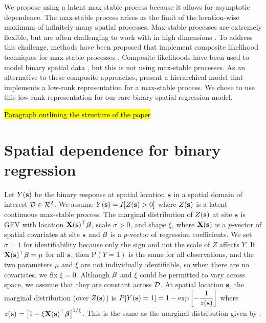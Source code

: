 \documentclass[11pt]{article}
\begin{document}
We propose using a latent max-stable process \citep{deHaan1984} because it allows for asymptotic dependence.
The max-stable process arises as the limit of the location-wise maximum of infinitely many spatial processes.
Max-stable processes are extremely flexible, but are often challenging to work with in high dimensions \citep{Wadsworth2014,Thibaud2013a}.
To address this challenge, methods have been proposed that implement composite likelihood techniques for max-stable processes \citep{Padoan2010,Genton2011,Huser2014}.
Composite likelihoods have been used to model binary spatial data \citep{Heagerty1998}, but this is not using max-stable processes.
As an alternative to these composite approaches, \citet{Reich2012} present a hierarchical model that implements a low-rank representation for a max-stable process.
We chose to use this low-rank representation for our rare binary spatial regression model.

\hl{Paragraph outlining the structure of the paper}

\section{Spatial dependence for binary regression} \label{rbs:maxstab}
Let $Y(\mbox{\bf s})$ be the binary response at spatial location $\mbox{\bf s}$ in a spatial domain of interest ${\cal D} \in {\cal R}^2$.
We assume $Y(\mbox{\bf s}) = I[Z(\mbox{\bf s}) > 0]$ where $Z(\mbox{\bf s})$ is a latent continuous max-stable process.
The marginal distribution of $Z(\mbox{\bf s})$ at site $\mbox{\bf s}$ is GEV with location $\mbox{\bf X}(\mbox{\bf s})^\top \mbox{\boldmath $\beta$}$, scale $\sigma > 0$, and shape $\xi$, where $\mbox{\bf X}(\mbox{\bf s})$ is a $p$-vector of spatial covariates at site $\mbox{\bf s}$ and $\mbox{\boldmath $\beta$}$ is a $p$-vector of regression coefficients.
We set $\sigma = 1$ for identifiability because only the sign and not the scale of $Z$ affects $Y$.
If $\mbox{\bf X}(\mbox{\bf s})^\top \mbox{\boldmath $\beta$} = \mu$ for all $\mbox{\bf s}$, then P$(Y = 1)$ is the same for all observations, and the two parameters $\mu$ and $\xi$ are not individually identifiable, so when there are no covariates, we fix $\xi = 0$.
Although $\mbox{\boldmath $\beta$}$ and $\xi$ could be permitted to vary across space, we assume that they are constant across ${\cal D}$.
At spatial location $\mbox{\bf s}$, the marginal distribution (over $Z(\mbox{\bf s})$) is \mbox{$P[Y(\mbox{\bf s}) = 1] = 1 - \exp\left[ -\displaystyle\frac{ 1 }{ z(\mbox{\bf s})} \right]$} where $z(\mbox{\bf s}) = \left[1 - \xi \mbox{\bf X}(\mbox{\bf s})^\top \mbox{\boldmath $\beta$}\right]^{1 / \xi}$.
This is the same as the marginal distribution given by \citet{Wang2010}.
\end{document}
